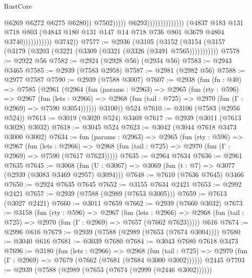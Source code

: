 \begin{lexlean}{RustCore}
\begin{coremodule}
                                                                    @6269
                                                                    @6272
                                                                    @6275
                                                                    @6280))
                                                                @7502)))))
                                                      @6293))))))))))))))
                          (@4837
                            @183
                            @131
                            @718
                            @803
                            (@4843 @180 @131 @147 @14 @718 @736 @801 @3679 @4804 @3740)))))))))))
        @3742))
@7577 := @2936
    (@3105 (@3152 (@3154 (@3157 (@3179 (@3203 (@3221 (@3309 (@3321 (@3326 (@3491 @7565)))))))))))
@7578 := @2922 @56
@7582 := @2924 (@2928 @56) (@2934 @56)
@7583 := @2943 @3465
@7585 := @2939 (@7583 @2958)
@7587 := @2981 (@2982 @56)
@7588 := @2977 @7587
@7590 := @2939 (@7588 @3007)
@7607 := @2938
    (fun (fn : @40) =>
    @7585
      (@2961
        (@2964
          (fun (params : @2963) =>
          @2965
            (fun (rty : @596) =>
            @2967
              (fun (lets : @2966) =>
              @2968 (fun (tail : @725) => @2970 (fun (Γ : @2969) => @7590 @3054))))))
        @3100))
    @524
@7610 := @3106 (@7583 (@2956 @524))
@7613 := @3019 (@3020 @524) @3469
@7617 := @2939 (@3011 (@7613 @3028) @3032)
@7618 := @3045 @524
@7623 := @3042 (@3044 @7618 @3473 @3000 @3002)
@7634 := fun (params : @2963) =>
  @2965
    (fun (rty : @596) =>
    @2967
      (fun (lets : @2966) =>
      @2968 (fun (tail : @725) => @2970 (fun (Γ : @2969) => @7590 (@7617 @7623)))))
@7635 := @2964 @7634
@7636 := @2961 @7635
@7645 := @3068 (fun (U : @3067) => @3069 (fun (t : @7) => @3077 (@2939 (@3083 @3469 @2957) @3094)))
@7648 := @7610 (@7636 @7645) @3466
@7650 := @2924 @7635 @7645
@7652 := @3155 @7634 @2421
@7653 := @2992 @2421
@7657 := @2939 (@7588 (@2989 (@7653 @3005)))
@7659 := @7613 (@3027 @2421)
@7660 := @3011 @7659
@7662 := @2939 (@7660 @3032)
@7673 := @3158
    (fun (rty : @596) =>
    @2967
      (fun (lets : @2966) =>
      @2968 (fun (tail : @725) => @2970 (fun (Γ : @2969) => @7657 (@7662 @7623)))))
    @616
@7674 := @2996 @616
@7679 := @2939 (@7588 (@2989 (@7653 (@7674 @3004))))
@7680 := @3040 @616
@7681 := @3039 @7680
@7684 := @3043 @7680 @7618 @3473
@7696 := @3180
    (fun (lets : @2966) =>
    @2968
      (fun (tail : @725) => @2970 (fun (Γ : @2969) => @7679 (@7662 (@7681 (@7684 @3000 @3002))))))
    @2445
@7703 := @2939 (@7588 (@2989 (@7653 (@7674 (@2999 (@2446 @3002))))))

\end{coremodule}
\end{lexlean}
